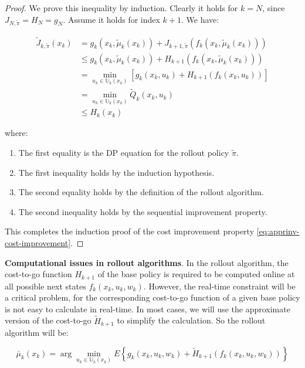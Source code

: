 \documentclass[
]{book}
\theoremstyle{definition}
\theoremstyle{definition}
\theoremstyle{definition}
\theoremstyle{definition}
\theoremstyle{remark}
\begin{document}
\begin{proof}
We prove this inequality by induction. Clearly it holds for \(k=N\), since \(J_{N,\tilde \pi} = H_N = g_N\). Assume it holds for index \(k+1\). We have:

\begin{align}
\tilde J_{k, \tilde \pi}(x_k) &= g_k(x_k, \tilde \mu_k(x_k)) + J_{k+1,\tilde \pi}(f_k(x_k, \tilde \mu_k(x_k))) \\
&\leq g_k(x_k, \tilde \mu_k(x_k)) + H_{k+1}(f_k(x_k, \tilde \mu_k(x_k))) \\ 
&= \min_{u_k \in \mathbb U_k(x_k)} \left[g_k(x_k,u_k) + H_{k+1} (f_k(x_k,u_k))\right] \\ 
&= \min_{u_k \in \mathbb U_k(x_k)} \tilde Q_k(x_k,u_k) \\
&\leq H_k(x_k)
\end{align}

where:

\begin{enumerate}
\def\labelenumi{\alph{enumi}.}
\item
  The first equality is the DP equation for the rollout policy \(\tilde \pi\).
\item
  The first inequality holds by the induction hypothesis.
\item
  The second equality holds by the definition of the rollout algorithm.
\item
  The second inequality holds by the sequential improvement property.
\end{enumerate}

This completes the induction proof of the cost improvement property \eqref{eq:apprinv-cost-improvement}.
\end{proof}

\textbf{Computational issues in rollout algorithms}. In the rollout algorithm, the cost-to-go function \(H_{k+1}\) of the base policy is required to be computed online at all possible next states \(f_k(x_k,u_k,w_k)\). However, the real-time constraint will be a critical problem, for the corresponding cost-to-go function of a given base policy is not easy to calculate in real-time.
In most cases, we will use the approximate version of the cost-to-go \(\tilde H_{k+1}\) to simplify the calculation. So the rollout algorithm will be:

\begin{equation}
\bar\mu_k(x_k) = \arg\min_{u_k\in\mathbb U_k(x_k)} E\left\{g_k(x_k,u_k,w_k)+\tilde H_{k+1}(f_k(x_k,u_k,w_k))\right\} \label{eq:apprinv-rollout-3}
\end{equation}
\end{document}
